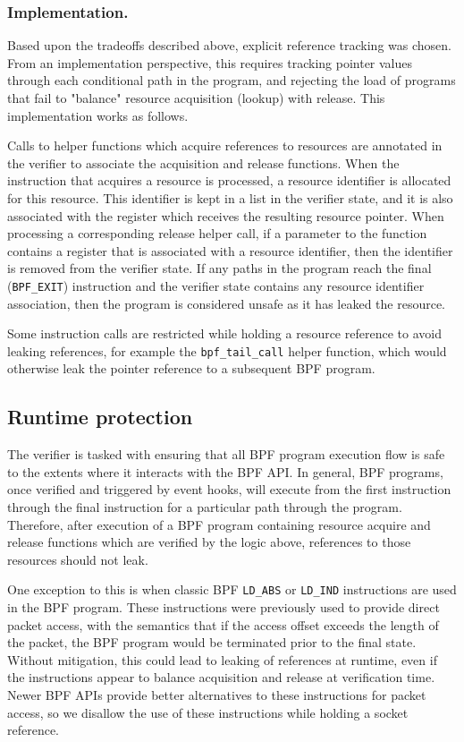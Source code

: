 \documentclass[10pt,sigconf,authorversion]{lpc}
\begin{document}
\subsubsection{Implementation.}

Based upon the tradeoffs described above, explicit reference tracking was
chosen. From an implementation perspective, this requires tracking pointer
values through each conditional path in the program, and rejecting the load of
programs that fail to "balance" resource acquisition (lookup) with release.
This implementation works as follows.

Calls to helper functions which acquire references to resources are annotated
in the verifier to associate the acquisition and release functions. When the
instruction that acquires a resource is processed, a resource identifier is
allocated for this resource. This identifier is kept in a list in the verifier
state, and it is also associated with the register which receives the resulting
resource pointer. When processing a corresponding release helper call, if a
parameter to the function contains a register that is associated with a
resource identifier, then the identifier is removed from the verifier state. If
any paths in the program reach the final (\verb+BPF_EXIT+) instruction and the
verifier state contains any resource identifier association, then the program
is considered unsafe as it has leaked the resource.

Some instruction calls are restricted while holding a resource reference to
avoid leaking references, for example the \verb+bpf_tail_call+ helper function,
which would otherwise leak the pointer reference to a subsequent BPF program.

\subsection{Runtime protection}

The verifier is tasked with ensuring that all BPF program execution flow is
safe to the extents where it interacts with the BPF API. In general, BPF
programs, once verified and triggered by event hooks, will execute from the
first instruction through the final instruction for a particular path through
the program. Therefore, after execution of a BPF program containing resource
acquire and release functions which are verified by the logic above, references
to those resources should not leak.

One exception to this is when classic BPF \verb+LD_ABS+ or \verb+LD_IND+
instructions are used in the BPF program. These instructions were previously
used to provide direct packet access, with the semantics that if the access
offset exceeds the length of the packet, the BPF program would be terminated
prior to the final state. Without mitigation, this could lead to leaking of
references at runtime, even if the instructions appear to balance acquisition
and release at verification time. Newer BPF APIs provide better alternatives to
these instructions for packet access, so we disallow the use of these
instructions while holding a socket reference.
\end{document}
